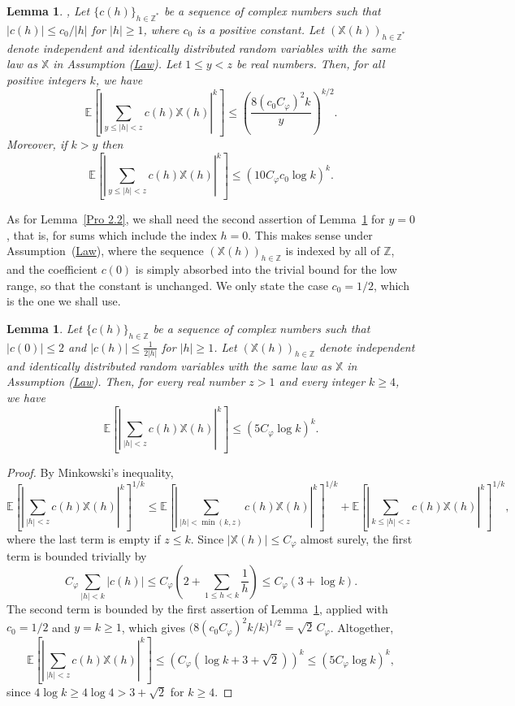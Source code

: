 \documentclass[12pt]{amsart}
\newtheorem{lem}[thm]{Lemma}
\theoremstyle{definition}
\numberwithin{equation}{section}
\numberwithin{equation}{section}
\def\E{\mathbb{E}}
\def\Z{\mathbb{Z}}
\def\Mp{C_\varphi}
\def\X{\mathbb{X}}
\def\E{\mathbb{E}}
\begin{document}
\begin{lem}\cite[Lemma 3.1]{Lam20}, \cite[Lemma 5.1]{ABL21} \label{Lemme 3.1}
    Let $\{c(h)\}_{h\in\Z^*}$ be a sequence of complex numbers such that $|c(h)| \leq c_0/|h|$
for $|h| \geq 1$, where $c_0$ is a positive constant. Let 
$(\X(h))_{h\in\Z^*}$ denote independent and identically distributed random variables with the same law as $\X$ in Assumption (\hyperlink{Ass Law}{Law}). 
Let $1 \leq y < z$ be real numbers. Then, for all
positive integers $k$, we have
\[\E \left[ \left|
\sum_{
y \leq|h|<z}
c(h)\X(h)
\right|^k \right]
\leq   \left(\frac{8(c_0 \Mp )^2 k}{y}\right)^{k/2} .\]
Moreover, if $k > y$ then
\[\E
\left[
\left|
\sum_{
y \leq |h|<z}
c(h)\X(h)
\right|^k\right]
\leq ( 10 \Mp c_0 \log k)^k. \]
\end{lem}

As for Lemma~\ref{Pro 2.2}, we shall need the second assertion of Lemma~\ref{Lemme 3.1} for $y=0$, that is, for sums which include the index $h=0$. This makes sense under Assumption~(\hyperlink{Ass Law}{Law}), where the sequence $(\X(h))_{h\in\Z}$ is indexed by all of $\Z$, and the coefficient $c(0)$ is simply absorbed into the trivial bound for the low range, so that the constant is unchanged. We only state the case $c_0=1/2$, which is the one we shall use.

\begin{lem}\label{lem:moments h=0}
Let $\{c(h)\}_{h\in\Z}$ be a sequence of complex numbers such that
$|c(0)|\leq 2$ and $|c(h)|\leq \frac{1}{2|h|}$ for $|h|\geq 1$. Let
$(\X(h))_{h\in\Z}$ denote independent and identically distributed random
variables with the same law as $\X$ in Assumption (\hyperlink{Ass Law}{Law}).
Then, for every real number $z>1$ and every integer $k\geq 4$, we have
\[
  \E\left[\left|\sum_{|h|<z}c(h)\X(h)\right|^{k}\right]
  \leq \left(5\Mp\log k\right)^{k}.
\]
\end{lem}

\begin{proof} By Minkowski's inequality,
\[
  \E\left[\left|\sum_{|h|<z}c(h)\X(h)\right|^{k}\right]^{1/k}
  \leq \E\left[\left|\sum_{|h|<\min(k,z)}c(h)\X(h)\right|^{k}\right]^{1/k}
  + \E\left[\left|\sum_{k\leq|h|<z}c(h)\X(h)\right|^{k}\right]^{1/k},
\]
where the last term is empty if $z\leq k$. Since $|\X(h)|\leq \Mp$ almost surely, the
first term is bounded trivially by
\[
  \Mp \sum_{|h|<k}|c(h)|
  \leq \Mp\left(2+\sum_{1\leq h<k}\frac1h\right)\leq \Mp\left(3+\log k\right).
\]
The second term is bounded by the first assertion of Lemma~\ref{Lemme 3.1}, applied with
$c_0=1/2$ and $y=k\geq 1$, which gives $\big(8(c_0\Mp)^2k/k\big)^{1/2}=\sqrt{2}\,\Mp$.
Altogether,
\[
  \E\left[\left|\sum_{|h|<z}c(h)\X(h)\right|^{k}\right]
  \leq \left(\Mp\left(\log k+3+\sqrt2\right)\right)^k\leq \left(5\Mp\log k \right)^k,
\]
since $4\log k\geq 4\log 4>3+\sqrt2$ for $k\geq 4$.
\end{proof}
\end{document}
